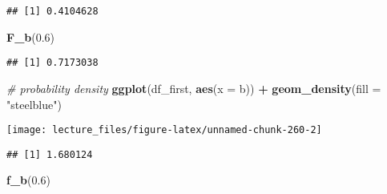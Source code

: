 \documentclass[
]{book}
\newenvironment{Shaded}{\begin{snugshade}}{\end{snugshade}}
\newcommand{\CommentTok}[1]{\textcolor[rgb]{0.56,0.35,0.01}{\textit{#1}}}
\newcommand{\DataTypeTok}[1]{\textcolor[rgb]{0.13,0.29,0.53}{#1}}
\newcommand{\FloatTok}[1]{\textcolor[rgb]{0.00,0.00,0.81}{#1}}
\newcommand{\KeywordTok}[1]{\textcolor[rgb]{0.13,0.29,0.53}{\textbf{#1}}}
\newcommand{\NormalTok}[1]{#1}
\newcommand{\OperatorTok}[1]{\textcolor[rgb]{0.81,0.36,0.00}{\textbf{#1}}}
\newcommand{\StringTok}[1]{\textcolor[rgb]{0.31,0.60,0.02}{#1}}
\begin{document}
\begin{Shaded}
\end{Shaded}

\begin{verbatim}
## [1] 0.4104628
\end{verbatim}

\begin{Shaded}
\begin{Highlighting}[]
\KeywordTok{F_b}\NormalTok{(}\FloatTok{0.6}\NormalTok{)}
\end{Highlighting}
\end{Shaded}

\begin{verbatim}
## [1] 0.7173038
\end{verbatim}

\begin{Shaded}
\begin{Highlighting}[]
\CommentTok{# probability density}
\KeywordTok{ggplot}\NormalTok{(df_first, }\KeywordTok{aes}\NormalTok{(}\DataTypeTok{x =}\NormalTok{ b)) }\OperatorTok{+}\StringTok{ }\KeywordTok{geom_density}\NormalTok{(}\DataTypeTok{fill =} \StringTok{"steelblue"}\NormalTok{)}
\end{Highlighting}
\end{Shaded}

\begin{center}\texttt{[image: lecture\_files/figure-latex/unnamed-chunk-260-2]} \end{center}

\begin{Shaded}
\end{Shaded}

\begin{verbatim}
## [1] 1.680124
\end{verbatim}

\begin{Shaded}
\begin{Highlighting}[]
\KeywordTok{f_b}\NormalTok{(}\FloatTok{0.6}\NormalTok{)}
\end{Highlighting}
\end{Shaded}
\end{document}
